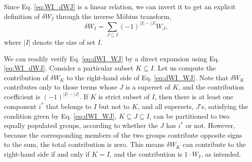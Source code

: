 \documentclass[preprint, superscriptaddress]{revtex4-1}
\begin{document}
Since Eq. \eqref{eq:WI_dWJ} is a linear relation,
we can invert it to get an explicit definition of $\delta W_I$
through the inverse M\"{o}bius transform\cite{bjorklund2007},
\begin{equation}
  \delta W_I =
  \sum_{J \subseteq I}
  (-1)^{|I| - |J|}
  W_J
  ,
  \label{eq:dWI_WJ}
\end{equation}
%
where $|I|$ denote the size of set $I$.

We can readily verify Eq. \eqref{eq:dWI_WJ}
by a direct expansion using Eq. \eqref{eq:WI_dWJ}.
%
Consider a particular subset $K \subseteq I$.
Let us compute the contribution of $\delta W_K$
to the right-hand side of Eq. \eqref{eq:dWI_WJ}.
%
Note that $\delta W_K$ contributes only to those terms
whose $J$ is a superset of $K$,
and the contribution coefficient is $(-1)^{|I|-|J|}$.
%
If $K$ is strict subset of $I$,
then there is at least one component $i^*$ that belongs to $I$
but not to $K$,
and all supersets, $J$'s,
satisfying the condition given by Eq. \eqref{eq:dWI_WJ},
$K \subseteq J \subseteq I$,
can be partitioned to two equally populated groups,
according to whether the $J$ has $i^*$ or not.
%
However, because the corresponding members of the two groups
contribute opposite signs to the sum,
the total contribution is zero.
%
This means $\delta W_K$ can contribute to the right-hand side
if and only if $K = I$, and the contribution is $1 \cdot W_I$,
as intended.




\end{document}
